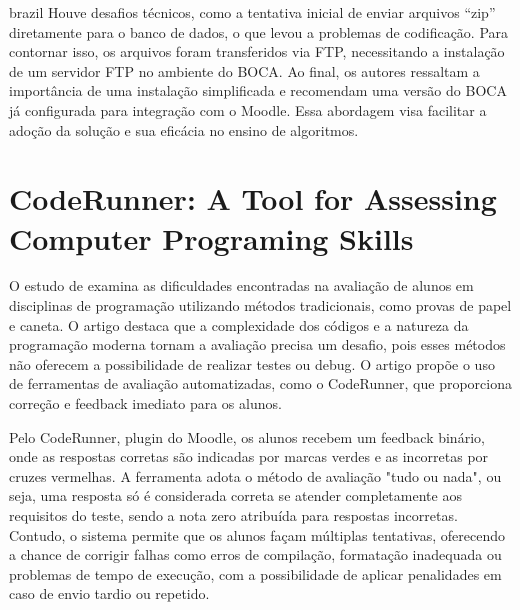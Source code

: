 \begin{otherlanguage*}{brazil}
Houve desafios técnicos, como a tentativa inicial de enviar arquivos “zip” diretamente para o banco de dados, o que levou a problemas de codificação. Para contornar isso, os arquivos foram transferidos via FTP, necessitando a instalação de um servidor FTP no ambiente do BOCA. Ao final, os autores ressaltam a importância de uma instalação simplificada e recomendam uma versão do BOCA já configurada para integração com o Moodle. Essa abordagem visa facilitar a adoção da solução e sua eficácia no ensino de algoritmos.

\section{CodeRunner: A Tool for Assessing Computer Programing Skills}

O estudo de \textcite{lobbharlow} examina as dificuldades encontradas na avaliação de alunos em disciplinas de programação utilizando métodos tradicionais, como provas de papel e caneta. O artigo destaca que a complexidade dos códigos e a natureza da programação moderna tornam a avaliação precisa um desafio, pois esses métodos não oferecem a possibilidade de realizar testes ou debug. O artigo propõe o uso de ferramentas de avaliação automatizadas, como o CodeRunner, que proporciona correção e feedback imediato para os alunos.	

Pelo CodeRunner, plugin do Moodle, os alunos recebem um feedback binário, onde as respostas corretas são indicadas por marcas verdes e as incorretas por cruzes vermelhas. A ferramenta adota o método de avaliação "tudo ou nada", ou seja, uma resposta só é considerada correta se atender completamente aos requisitos do teste, sendo a nota zero atribuída para respostas incorretas. Contudo, o sistema permite que os alunos façam múltiplas tentativas, oferecendo a chance de corrigir falhas como erros de compilação, formatação inadequada ou problemas de tempo de execução, com a possibilidade de aplicar penalidades em caso de envio tardio ou repetido.


\end{otherlanguage*}
